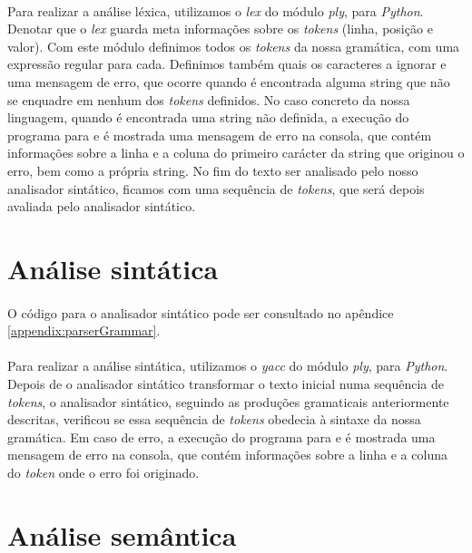 \documentclass[11pt,a4paper]{report}
\begin{document}
\paragraph*{}
Para realizar a análise léxica, utilizamos o \textit{lex} do módulo \textit{ply}, para \textit{Python}. Denotar que o \textit{lex} guarda meta informações sobre os \textit{tokens} (linha, posição e valor). Com este módulo definimos todos os \textit{tokens} da nossa gramática, com uma expressão regular para cada. Definimos também quais os caracteres a ignorar e uma mensagem de erro, que ocorre quando é encontrada alguma string que não se enquadre em nenhum dos \textit{tokens} definidos. No caso concreto da nossa linguagem, quando é encontrada uma string não definida, a execução do programa para e é mostrada uma mensagem de erro na consola, que contém informações sobre a linha e a coluna do primeiro carácter da string que originou o erro, bem como a própria string. No fim do texto ser analisado pelo nosso analisador sintático, ficamos com uma sequência de \textit{tokens}, que será depois avaliada pelo analisador sintático.

\section{Análise sintática}
\paragraph*{}
O código para o analisador sintático pode ser consultado no apêndice \ref{appendix:parserGrammar}.

\paragraph*{}
Para realizar a análise sintática, utilizamos o \textit{yacc} do módulo \textit{ply}, para \textit{Python}. Depois de o analisador sintático transformar o texto inicial numa sequência de \textit{tokens}, o analisador sintático, seguindo as produções gramaticais anteriormente descritas, verificou se essa sequência de \textit{tokens} obedecia à sintaxe da nossa gramática. Em caso de erro, a execução do programa para e é mostrada uma mensagem de erro na consola, que contém informações sobre a linha e a coluna do \textit{token} onde o erro foi originado.

\section{Análise semântica}
\end{document}
